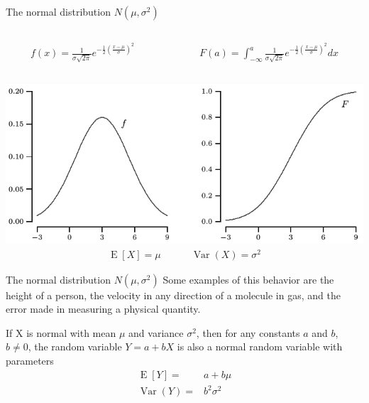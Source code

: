 \documentclass{beamer}
\newcommand{\E}{\operatorname{E}}
\newcommand{\Var}{\operatorname{Var}}
\begin{document}
\begin{frame}{The normal distribution $N(\mu,\sigma^2)$}
  \begin{columns}
    \begin{column}{0.5\textwidth}
      \begin{align*}
        f(x) = \frac{1}{\sigma\sqrt{2\pi}}
        e^{-\frac{1}{2}{\left(\frac{x-\mu}{\sigma}\right)}^2}
      \end{align*}
    \end{column}
    \begin{column}{0.5\textwidth}
      \begin{align*}
        F(a) = \int_{-\infty}^a \frac{1}{\sigma\sqrt{2\pi}}
        e^{-\frac{1}{2}{\left(\frac{x-\mu}{\sigma}\right)}^2}dx
      \end{align*}
    \end{column}
  \end{columns}
  \includegraphics[width=\linewidth]{normal-pdf}
  \begin{align*}
    \E[X]=\mu\quad\quad\quad\Var(X)=\sigma^2
  \end{align*}
\end{frame}

\begin{frame}{The normal distribution $N(\mu,\sigma^2)$}
  Some examples of this behavior are the height of a person, the velocity in any
  direction of a molecule in gas, and the error made in measuring a physical
  quantity.

  If X is normal with mean $\mu$ and variance $\sigma^2$, then for any constants
  $a$ and $b$, $b\ne 0$, the random variable $Y = a +bX$ is also a normal random
  variable with parameters
  \begin{align*}
    \E[Y] =& a + b\mu\\
    \Var(Y) =& b^2\sigma^2
  \end{align*}

\end{frame}
\end{document}
